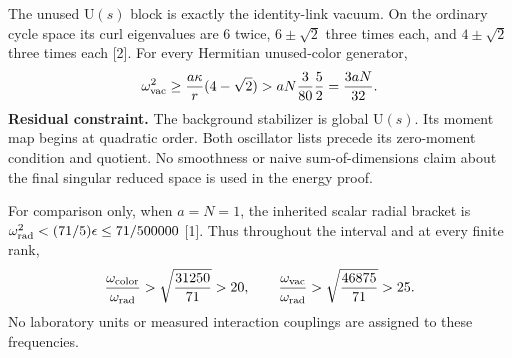 \documentclass[11pt,a4paper]{article}
\begin{document}
The unused $\mathrm U(s)$ block is exactly the identity-link vacuum. On the ordinary cycle space its curl eigenvalues are $6$ twice, $6\pm\sqrt2$ three times each, and $4\pm\sqrt2$ three times each [2]. For every Hermitian unused-color generator,
\[
\omega_{\rm vac}^2\ge\frac{a\kappa}{r}(4-\sqrt2)
>aN\frac3{80}\frac52=\frac{3aN}{32}.
\]
\textbf{Residual constraint.} The background stabilizer is global $\mathrm U(s)$. Its moment map begins at quadratic order. Both oscillator lists precede its zero-moment condition and quotient. No smoothness or naive sum-of-dimensions claim about the final singular reduced space is used in the energy proof.

For comparison only, when $a=N=1$, the inherited scalar radial bracket is $\omega_{\rm rad}^2<(71/5)\epsilon\le71/500000$ [1]. Thus throughout the interval and at every finite rank,
\[
\frac{\omega_{\rm color}}{\omega_{\rm rad}}>\sqrt{\frac{31250}{71}}>20,
\qquad
\frac{\omega_{\rm vac}}{\omega_{\rm rad}}>\sqrt{\frac{46875}{71}}>25.
\]
No laboratory units or measured interaction couplings are assigned to these frequencies.
\newpage
\end{document}
